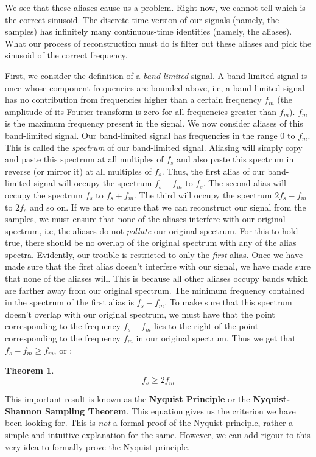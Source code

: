 \documentclass{article}
\theoremstyle{definition}
\newtheorem{theorem}{Theorem}[subsection]
\begin{document}
	We see that these aliases cause us a problem. Right now, we cannot tell which is the correct sinusoid. The discrete-time version of our signals (namely, the samples) has infinitely many continuous-time identities (namely, the aliases). What our process of reconstruction must do is filter out these aliases and pick the sinusoid of the correct frequency. \smallskip
	
	First, we consider the definition of a \textit{band-limited} signal. A band-limited signal is once whose component frequencies are bounded above, i.e, a band-limited signal has no contribution from frequencies higher than a certain frequency $f_m$ (the amplitude of its Fourier transform is zero for all frequencies greater than $f_m$). $f_m$ is the maximum frequency present in the signal. We now consider aliases of this band-limited signal. Our band-limited signal has frequencies in the range $0$ to $f_m$. This is called the \textit{spectrum} of our band-limited signal. Aliasing will simply copy and paste this spectrum at all multiples of $f_s$ and also paste this spectrum in reverse (or mirror it) at all multiples of $f_s$. Thus, the first alias of our band-limited signal will occupy the spectrum $f_s - f_m$ to $f_s$. The second alias will occupy the spectrum $f_s$ to $f_s + f_m$. The third will occupy the spectrum $2f_s - f_m$ to $2f_s$ and so on. If we are to ensure that we can reconstruct our signal from the samples, we must ensure that none of the aliases interfere with our original spectrum, i.e, the aliases do not \textit{pollute} our original spectrum. For this to hold true, there should be no overlap of the original spectrum with any of the alias spectra. Evidently, our trouble is restricted to only the \textit{first} alias. Once we have made sure that the first alias doesn't interfere with our signal, we have made sure that none of the aliases will. This is because all other aliases occupy bands which are farther away from our original spectrum. The minimum frequency contained in the spectrum of the first alias is $f_s - f_m$. To make sure that this spectrum doesn't overlap with our original spectrum, we must have that the point corresponding to the frequency $f_s - f_m$ lies to the right of the point corresponding to the frequency $f_m$ in our original spectrum. Thus we get that $f_s - f_m \geq f_m$, or :
	\begin{theorem}
				\[ \boxed{f_s \geq 2f_m} \] 
	\end{theorem}

		
		This important result is known as the \textbf{Nyquist Principle} or the \textbf{Nyquist-Shannon Sampling Theorem}. This equation gives us the criterion we have been looking for. This is \textit{not} a formal proof of the Nyquist principle, rather a simple and intuitive explanation for the same. However, we can add rigour to this very idea to formally prove the Nyquist principle. \smallskip 
		
\end{document}
